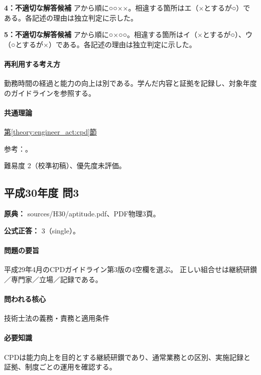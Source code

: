 \noindent\textbf{4：不適切な解答候補} アから順に○○××。相違する箇所はエ（×とするが○）である。各記述の理由は独立判定に示した。\par

\noindent\textbf{5：不適切な解答候補} アから順に○×○○。相違する箇所はイ（×とするが○）、ウ（○とするが×）である。各記述の理由は独立判定に示した。\par

\paragraph{再利用する考え方} 勤務時間の経過と能力の向上は別である。学んだ内容と証拠を記録し、対象年度のガイドラインを参照する。

\paragraph{共通理論} \hyperref[theory:engineer_act:cpd]{第\ref*{theory:engineer_act:cpd}節}

\par 参考：\cite{cpd_v2}。

\par 難易度 2（校準初稿）、優先度未評価。

\subsection{平成30年度 問3}
\label{q:h30-reg-apt-03}

\noindent\textbf{原典：} sources/H30/aptitude.pdf、PDF物理3頁。

\textbf{公式正答：} 3（single）。

\paragraph{問題の要旨} 平成29年4月のCPDガイドライン第3版の4空欄を選ぶ。 正しい組合せは継続研鑚／専門家／立場／記録である。

\paragraph{問われる核心} 技術士法の義務・責務と適用条件

\paragraph{必要知識} CPDは能力向上を目的とする継続研鑚であり、通常業務との区別、実施記録と証拠、制度ごとの運用を確認する。

